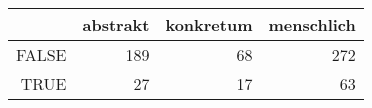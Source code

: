 \begin{tabular}{rrrr}
  \hline
 & abstrakt & konkretum & menschlich \\ 
  \hline
FALSE & 189 &  68 & 272 \\ 
  TRUE &  27 &  17 &  63 \\ 
   \hline
\end{tabular}
